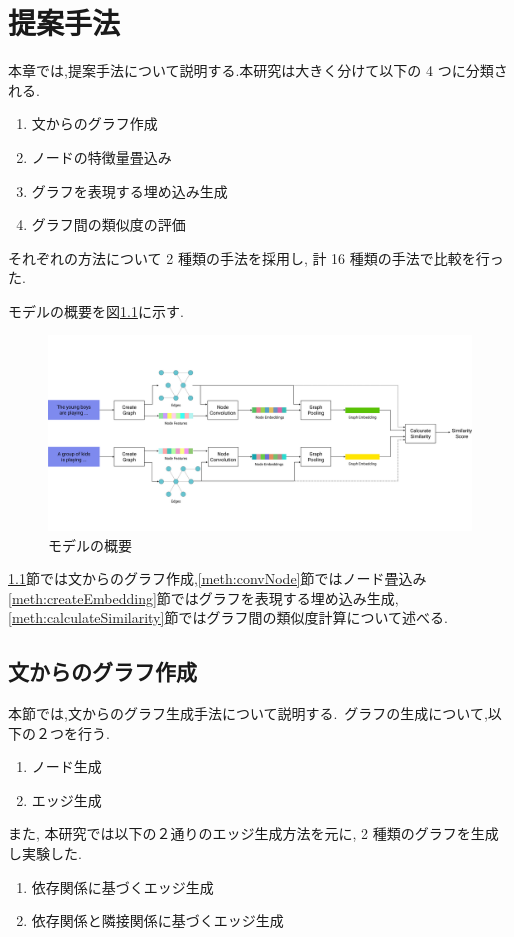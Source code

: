 \documentclass[a4j,twoside,12pt, dvipdfmx]{thesis} %
\begin{document}
\addtocounter{chapter}{+2}

\setlength{\baselineskip}{1.95zw}
\setlength{\textheight}{30\baselineskip}
\mainmatter

\fi
%
\renewcommand\thefootnote{\arabic{footnote})}
\def\vector#1{\mbox{\boldmath $#1$}}

\chapter{提案手法}\label{meth}
本章では,提案手法について説明する.本研究は大きく分けて以下の 4 つに分類される.
\begin{enumerate}
  \item 文からのグラフ作成
  \item ノードの特徴量畳込み
  \item グラフを表現する埋め込み生成
  \item グラフ間の類似度の評価
\end{enumerate}
それぞれの方法について 2 種類の手法を採用し, 計 16 種類の手法で比較を行った. \par
モデルの概要を図\ref{fig:ModelFlow}に示す.
\begin{figure}
  \centering
  \includegraphics[width=\linewidth]
  {img/ModelFlow.jpg}
  \caption{モデルの概要}
  \label{fig:ModelFlow}
\end{figure}

\ref{meth:createGraph}節では文からのグラフ作成,\ref{meth:convNode}節ではノード畳込み \ref{meth:createEmbedding}節ではグラフを表現する埋め込み生成, \ref{meth:calculateSimilarity}節ではグラフ間の類似度計算について述べる.

\section{文からのグラフ作成}\label{meth:createGraph}
本節では,文からのグラフ生成手法について説明する.\
グラフの生成について,以下の２つを行う.
\begin{enumerate}
  \item ノード生成
  \item エッジ生成
\end{enumerate}
また, 本研究では以下の２通りのエッジ生成方法を元に, 2 種類のグラフを生成し実験した.
\begin{enumerate}
  \item 依存関係に基づくエッジ生成
  \item 依存関係と隣接関係に基づくエッジ生成
\end{enumerate}
\end{document}
